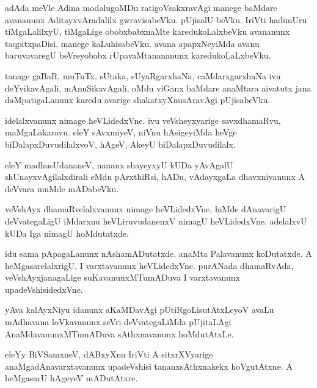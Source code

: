 \documentclass{article}
\begin{document}
\begin{mn}
adAda  meVle  Adina  modalugoMDu  ratigoVsakxravAgi  manege  baMdare  avananunx  AditayxvAradalilx  
gwravisabeVku.  pUjisalU  beVku.  IriVti  hadimUru  tiMgaLalilxyU,  tiMgaLige  obobxbabxnaMte  
karedukoLalxbeVku  avananunx  taqpitxpaDisi,  manege  kaLuhisabeVku.  avana  apapxNeyiMda  
avanu  baruvavaregU  beVreyobabx  rUpavaMtanananunx  karedukoLaLxbeVku.
\end{mn}

\begin{mn}
tanage  gaBaR, muTuTx,  sUtaka,  sUyaRgarxhaNa,  caMdarxgarxhaNa  ivu  deYvikavAgali,  mAnuSikavAgali,  oMdu  
viGanx  baMdare  anaMtara  aivatutx  jana  daMpatigaLanunx  karedu  avarige  shakatxyXnusAravAgi  pUjisabeVku.
\end{mn}

\begin{mn}
idelalxvanunx  nimage  heVLidedxVne.  ivu  veVsheyxyarige  savxdhamaRvu,  maMgaLakaravu.  eleY  
sAvxmiyeV,  niVnu  hAsigeyiMda   heVge  biDalapxDuvudilalxvoV,  hAgeV,  AkeyU  biDalapxDuvudilalx.
\end{mn}

\begin{mn}
eleY  madhusUdananeV,  nananx  shayeyxyU  kUDa  yAvAgalU  shUnayxvAgilalxdirali  eMdu  pArxthiRsi,  
hADu,  vAdayxgaLa  dhavxniyanunx  A  deVvara  muMde  mADabeVku.
\end{mn}

\begin{mn}
veVshAyx  dhamaRvelalxvanunx  nimage  heVLidedxVne,  hiMde  dAnavarigU  deVvategaLigU  
iMdarxnu  heVLiruvudanenxV  nimagU  heVLidedxVne.  adelalxvU  kUDa  Iga  nimagU  hoMdutatxde.
\end{mn}

\begin{mn}
idu  sama  pApagaLanunx  nAshamADutatxde.  anaMta  Palavanunx  koDutatxde.  A  
heMgasarelalxrigU,  I  varxtavanunx  heVLidedxVne.  purANada  dhamaRvAda,  
veVshAyxjanagaLige  suKavanunxMTumADuva  I  varxtavanunx  upadeVshisidedxVne. 
\end{mn}

\begin{mn}
yAva  kalAyxNiyu  idanunx  aKaMDavAgi  pUtiRgoLisutAtxLeyoV  avaLu  mAdhavana  loVkavanunx  
seVri  deVvategaLiMda  pUjitaLAgi  AnaMdavanunxMTumADuva  sAthxnavanunx  hoMdutAtxLe.
\end{mn}

\begin{mn}
eleYy  BiVSamxneV,  dABxyXnu  IriVti  A  sitxrXVyarige  anaMgadAnavarxtavanunx  upadeVshisi  
tananxsAthxnakekx  hoVgutAtxne.  A  heMgasarU  hAgeyeV  mADutAtxre.
\end{mn}
\end{document}

